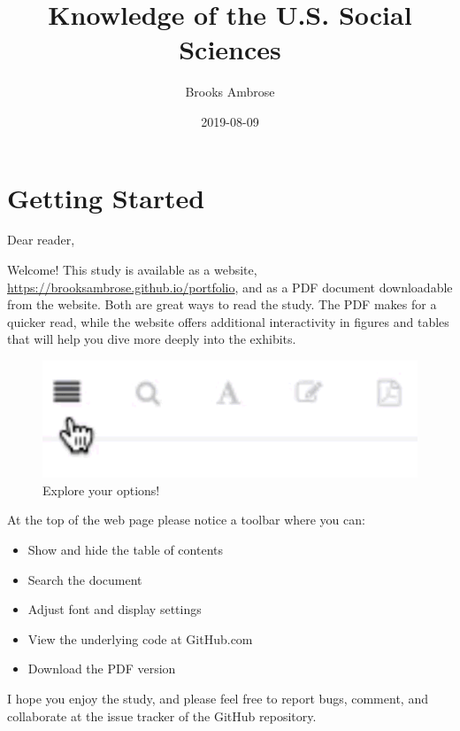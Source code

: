 \documentclass[]{book}
\title{Knowledge of the U.S. Social Sciences}
\author{Brooks Ambrose}
\date{2019-08-09}
\providecommand{\tightlist}{%
  \setlength{\itemsep}{0pt}\setlength{\parskip}{0pt}}
\theoremstyle{definition}
\theoremstyle{definition}
\theoremstyle{definition}
\theoremstyle{remark}
\begin{document}
\maketitle

{
\setcounter{tocdepth}{2}
\tableofcontents
}
\listoftables
\listoffigures
\hypertarget{getting-started}{%
\chapter*{Getting Started}\label{getting-started}}


Dear reader,

Welcome! This study is available as a website,
\url{https://brooksambrose.github.io/portfolio}, and as a PDF document
downloadable from the website. Both are great ways to read the study.
The PDF makes for a quicker read, while the website offers additional
interactivity in figures and tables that will help you dive more deeply
into the exhibits.

\begin{figure}

{\centering \includegraphics[width=0.9\linewidth]{img/toolbar} 

}

\caption{Explore your options!}\label{fig:toolbar}
\end{figure}

At the top of the web page please notice a toolbar where you can:

\begin{itemize}
\tightlist
\item
  Show and hide the table of contents
\item
  Search the document
\item
  Adjust font and display settings
\item
  View the underlying code at GitHub.com
\item
  Download the PDF version
\end{itemize}

I hope you enjoy the study, and please feel free to report bugs,
comment, and collaborate at the issue tracker of the GitHub repository.
\end{document}
